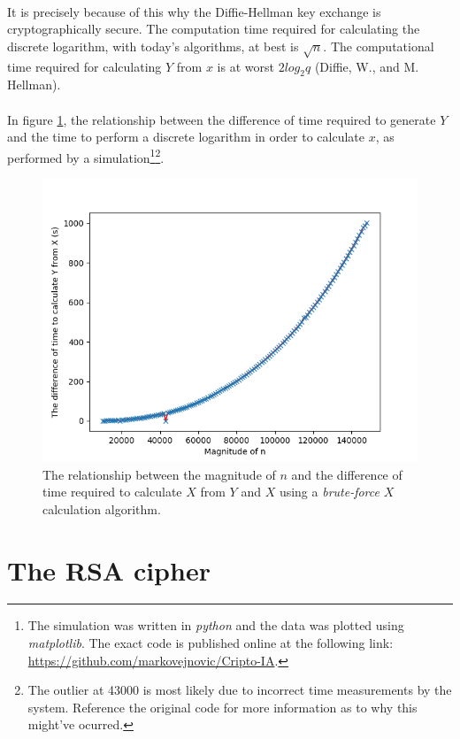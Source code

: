 \documentclass[a4paper, 10pt]{article}
\begin{document}
\paragraph*{}
It is precisely because of this why the Diffie-Hellman key exchange is cryptographically secure. The computation time 
required for calculating the discrete logarithm, with today's algorithms, at best is $\sqrt{n}$. The computational 
time required for calculating $Y$ from $x$ is at worst $2log_2 q$ (Diffie, W., and M. Hellman).

\paragraph*{}
In figure \ref{fig:n-xy-time}, the relationship between the difference of time required to generate $Y$ and the time 
to perform a discrete logarithm in order to calculate $x$, as performed by a simulation\footnote{The simulation was 
written in \textit{python} and the data was plotted using \textit{matplotlib}. The exact code is published online at 
the following link: \url{https://github.com/markovejnovic/Cripto-IA}.}\footnote{The outlier at 43000 is most likely due
 to incorrect time measurements by the system. Reference the original code for more information as to why this might've
 ocurred.}.
\begin{figure}[ht]
\includegraphics[width=12cm]{n_xy-time_relationship}
\centering
\caption{The relationship between the magnitude of $n$ and the difference of time required to calculate $X$ from $Y$ 
and $X$ using a \textit{brute-force} $X$ calculation algorithm.}
\label{fig:n-xy-time}
\end{figure}

\section{The RSA cipher}
\end{document}

